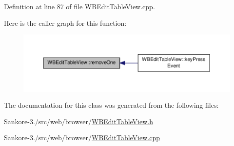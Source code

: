 Definition at line 87 of file W\-B\-Edit\-Table\-View.\-cpp.



Here is the caller graph for this function\-:
\nopagebreak
\begin{figure}[H]
\begin{center}
\leavevmode
\includegraphics[width=350pt]{d4/df9/class_w_b_edit_table_view_aad3c7f889095383b0e38c550688b7221_icgraph}
\end{center}
\end{figure}




The documentation for this class was generated from the following files\-:\begin{DoxyCompactItemize}
\item 
Sankore-\/3./src/web/browser/\hyperlink{_w_b_edit_table_view_8h}{W\-B\-Edit\-Table\-View.\-h}\item 
Sankore-\/3./src/web/browser/\hyperlink{_w_b_edit_table_view_8cpp}{W\-B\-Edit\-Table\-View.\-cpp}\end{DoxyCompactItemize}
